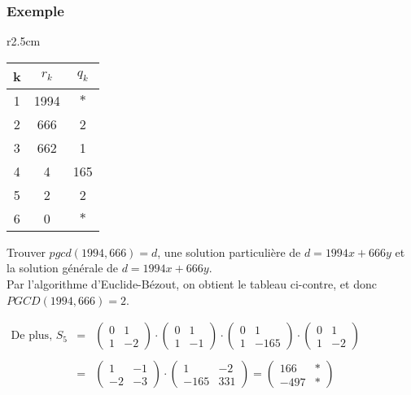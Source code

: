 \documentclass[a4paper,10pt]{book} %
\begin{document}
\subsubsection{Exemple}
\begin{wrapfigure}{r}{2.5cm}
\begin{tabular}{|c|cc|}
\hline k & $r_k$ & $q_k$ \\
\hline 1 & 1994 & $*$ \\
2 & 666 & 2 \\
3 & 662 & 1 \\
4 & 4 & 165 \\
5 & 2 & 2 \\
6 & 0 & $*$ \\
\hline
\end{tabular}
\end{wrapfigure}

Trouver $pgcd(1994,666)=d$, une solution particulière de $d=1994x+666y$ et la solution générale de $d=1994x+666y$.\\

Par l'algorithme d'Euclide-Bézout, on obtient le tableau ci-contre, et donc $PGCD(1994,666)=2$.

$\begin{array}{rcl}\text{De plus, }S_5&=&\begin{pmatrix}0&1\\1&-2\end{pmatrix}\cdot\begin{pmatrix}0&1\\1&-1\end{pmatrix} \cdot\begin{pmatrix}0&1\\1&-165\end{pmatrix}\cdot\begin{pmatrix}0&1\\1&-2\end{pmatrix}\\\\ &=&\begin{pmatrix}1&-1\\-2&-3\end{pmatrix}\cdot\begin{pmatrix}1 & -2 \\ -165 & 331\end{pmatrix} =\begin{pmatrix}166 & * \\ -497 & * \end{pmatrix}\end{array}$\\\\
\end{document}
